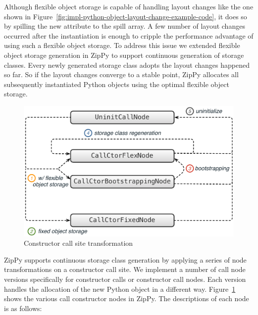 Although flexible object storage is capable of handling layout changes like the one shown in Figure~\ref{fig:impl-python-object-layout-change-example-code}, it does so by spilling the new attribute to the spill array.
A few number of layout changes occurred after the instantiation is enough to cripple the performance advantage of using such a flexible object storage.
To address this issue we extended flexible object storage generation in ZipPy to support continuous generation of storage classes.
Every newly generated storage class adopts the layout changes happened so far.
So if the layout changes converge to a stable point, ZipPy allocates all subsequently instantiated Python objects using the optimal flexible object storage.

\begin{figure}
\centering
\includegraphics[scale=.45]{figures/constructor-call-site-transformation}
\caption{Constructor call site transformation}
\label{fig:impl-constructor-call-site-transformation}
\end{figure}

ZipPy supports continuous storage class generation by applying a series of node transformations on a constructor call site.
We implement a number of call node versions specifically for constructor calls or constructor call nodes.
Each version handles the allocation of the new Python object in a different way.
Figure~\ref{fig:impl-constructor-call-site-transformation} shows the various call constructor nodes in ZipPy.
The descriptions of each node is as follows:

